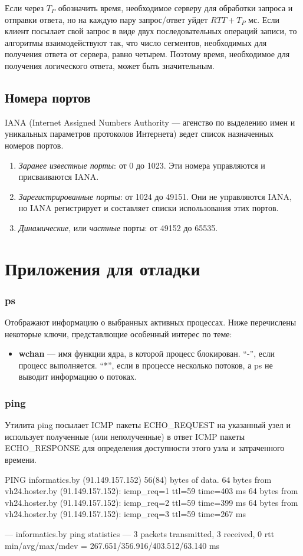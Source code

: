 Если через $T_P$ обозначить время, необходимое серверу для обработки запроса и отправки ответа, но на каждую пару запрос/ответ уйдет $RTT + T_P$ мс. Если клиент посылает свой запрос в виде двух последовательных операций записи, то алгоритмы взаимодействуют так, что число сегментов, необходимых для получения ответа от сервера, равно четырем. Поэтому время, необходимое для получения логического ответа, может быть значительным.

\subsection{Номера портов}
IANA (Internet Assigned Numbers Authority --- агенство по выделению имен и уникальных параметров протоколов Интернета) ведет список назначенных номеров портов.
\begin{enumerate}
  \item \emph{Заранее известные порты}: от 0 до 1023. Эти номера управляются и присваиваются IANA.
  \item \emph{Зарегистрированные порты}: от 1024 до 49151. Они не управляются IANA, но IANA регистрирует и составляет списки использования этих портов.
  \item \emph{Динамические}, или \emph{частные} порты: от 49152 до 65535.
\end{enumerate}

\section{Приложения для отладки}
\subsubsection{ps}
Отображают информацию о выбранных активных процессах. Ниже перечислены некоторые ключи, представлющие особенный интерес по теме:
\begin{itemize}
  \item \textbf{wchan} --- имя функции ядра, в которой процесс блокирован. ``-'', если процесс выполняется. ``*'', если в процессе несколько потоков, а ps не выводит информацию о потоках.
\end{itemize}

\subsubsection{ping}
Утилита ping посылает ICMP пакеты ECHO\_REQUEST на указанный узел и использует полученные (или неполученные) в ответ ICMP пакеты ECHO\_RESPONSE для определения доступности этого узла и затраченного времени.
\begin{plainlst}{}{}
PING informatics.by (91.149.157.152) 56(84) bytes of data.
64 bytes from vh24.hoster.by (91.149.157.152): icmp_req=1 ttl=59 time=403 ms
64 bytes from vh24.hoster.by (91.149.157.152): icmp_req=2 ttl=59 time=399 ms
64 bytes from vh24.hoster.by (91.149.157.152): icmp_req=3 ttl=59 time=267 ms

--- informatics.by ping statistics ---
3 packets transmitted, 3 received, 0%
rtt min/avg/max/mdev = 267.651/356.916/403.512/63.140 ms
\end{plainlst}

